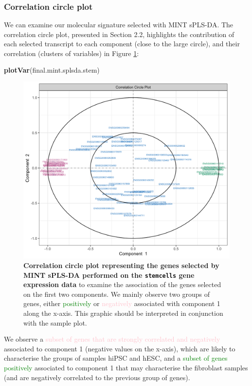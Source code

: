 \documentclass[]{book}
\newenvironment{Shaded}{\begin{snugshade}}{\end{snugshade}}
\newcommand{\KeywordTok}[1]{\textcolor[rgb]{0.13,0.29,0.53}{\textbf{#1}}}
\newcommand{\NormalTok}[1]{#1}
\begin{document}
\hypertarget{correlation-circle-plot}{%
\subsubsection{Correlation circle plot}\label{correlation-circle-plot}}

We can examine our molecular signature selected with MINT sPLS-DA. The correlation circle plot, presented in Section 2.2, highlights the contribution of each selected transcript to each component (close to the large circle), and their correlation (clusters of variables) in Figure \ref{fig:MINT-var-col}:

\begin{Shaded}
\begin{Highlighting}[]
\KeywordTok{plotVar}\NormalTok{(final.mint.splsda.stem)}
\end{Highlighting}
\end{Shaded}

\begin{figure}

{\centering \includegraphics[width=0.5\linewidth]{Figures/MINT/MINT-var-col-1} 

}

\caption{\textbf{Correlation circle plot representing the genes selected by MINT sPLS-DA performed on the \texttt{stemcells} gene expression data} to examine the association of the genes selected on the first two components. We mainly observe two groups of genes, either \textcolor{green}{positively} or \textcolor{pink}{negatively} associated with component 1 along the x-axis. This graphic should be interpreted in conjunction with the sample plot.}\label{fig:MINT-var-col}
\end{figure}



We observe a \textcolor{pink}{subset of genes that are strongly correlated and negatively} associated to component 1 (negative values on the x-axis), which are likely to characterise the groups of samples hiPSC and hESC, and a \textcolor{green}{subset of genes positively} associated to component 1 that may characterise the fibroblast samples (and are negatively correlated to the previous group of genes).
\end{document}
